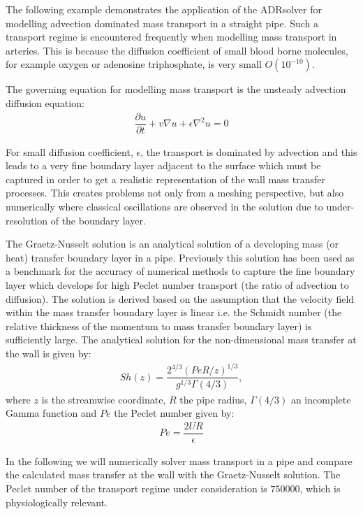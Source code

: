 The following example demonstrates the application of the ADRsolver for
modelling advection dominated mass transport in a straight pipe.
Such a transport regime is encountered frequently when modelling mass transport
in arteries. This is because the diffusion coefficient of small blood borne
molecules, for example oxygen or adenosine triphosphate, is very small
$O(10^{-10})$.

The governing equation for modelling mass transport is the unsteady advection
diffusion equation:
\begin{align*}
\dfrac{\partial u}{\partial t}  + v\nabla u +  \epsilon \nabla^2 u = 0
\end{align*}

For small diffusion coefficient, $\epsilon$, the transport is dominated by
advection and this leads to a very fine boundary layer adjacent to the surface
which must be captured in order to get a realistic representation of the wall
mass transfer processes. This creates problems not only from a meshing
perspective, but also numerically where classical oscillations are observed in
the solution due to under-resolution of the boundary layer.

The Graetz-Nusselt solution is an analytical solution of a developing mass (or
heat) transfer boundary layer in a pipe. Previously this solution has been used
as a benchmark for the accuracy of numerical methods to capture the fine
boundary layer which develops for high Peclet number transport (the ratio of
advection to diffusion). The solution is derived based on the assumption that
the velocity field within the mass transfer boundary layer is linear i.e. the
Schmidt number (the relative thickness of the momentum to mass transfer boundary
layer) is sufficiently large. The analytical solution for the non-dimensional
mass transfer at the wall is given by:
\begin{align*}
S h(z) = \dfrac{2^{4/3}(Pe R/z)^{1/3}}{g^{1/3}\Gamma(4/3)} , 
\end{align*}
where $z$ is the streamwise coordinate, $R$ the pipe radius, $\Gamma(4/3)$ an incomplete 
Gamma function and $Pe$ the Peclet number given by:
\begin{align*}
Pe = \dfrac{2 U R}{\epsilon}
\end{align*}

In the following we will numerically solver mass transport in a pipe and compare
the calculated mass transfer at the wall with the Graetz-Nusselt solution. The
Peclet number of the transport regime under consideration is $750000$, which is
physiologically relevant.

